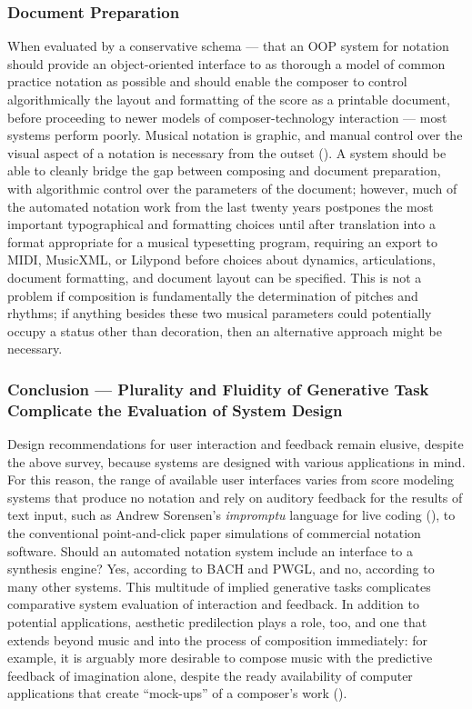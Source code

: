 \subsubsection{Document Preparation}
When evaluated by a conservative schema --- that an OOP system for notation should provide an object-oriented interface to as thorough a model of common practice notation as possible and should enable the composer to control algorithmically the layout and formatting of the score as a printable document, before proceeding to newer models of composer-technology interaction --- most systems perform poorly. Musical notation is graphic, and manual control over the visual aspect of a notation is necessary from the outset (\cite{Dannenberg:1993bh}). A system should be able to cleanly bridge the gap between composing and document preparation, with algorithmic control over the parameters of the document; however, much of the automated notation work from the last twenty years postpones the most important typographical and formatting choices until after translation into a format appropriate for a musical typesetting program, requiring an export to MIDI, MusicXML, or Lilypond before choices about dynamics, articulations, document formatting, and document layout can be specified. This is not a problem if composition is fundamentally the determination of pitches and rhythms; if anything besides these two musical parameters could potentially occupy a status other than decoration, then an alternative approach might be necessary.

\subsubsection{Conclusion --- Plurality and Fluidity of Generative Task Complicate the Evaluation of System Design}
Design recommendations for user interaction and feedback remain elusive, despite the above survey, because systems are designed with various applications in mind. For this reason, the range of available user interfaces varies from score modeling systems that produce no notation and rely on auditory feedback for the results of text input, such as Andrew Sorensen's \emph{impromptu} language for live coding (\cite{Sorensen:2013ij}), to the conventional point-and-click paper simulations of commercial notation software. Should an automated notation system include an interface to a synthesis engine? Yes, according to BACH and PWGL, and no, according to many other systems. This multitude of implied generative tasks complicates comparative system evaluation of interaction and feedback. In addition to potential applications, aesthetic predilection plays a role, too, and one that extends beyond music and into the process of composition immediately: for example, it is arguably more desirable to compose music with the predictive feedback of imagination alone, despite the ready availability of computer applications that create ``mock-ups'' of a composer's work (\cite{Morris:cr}).

